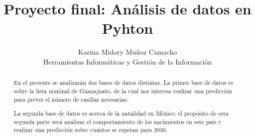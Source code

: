\documentclass[11pt]{article}
\title{\centering\fontsize{18}{16}\selectfont\textbf{Proyecto final: Análisis de datos en Pyhton}}
\author{Karina Midory Muñoz Camacho\\Herramientas Informáticas y Gestión de la Información}
\begin{document}
\maketitle

\begin{abstract}
	En el presente se analizarán dos bases de datos distintas. La primer base de datos es sobre la lista nominal de Guanajuato, de la cual nos interesa realizar una predicción para prever el número de casillas necesarias.\par La segunda base de datos es acerca de la natalidad en México; el propósito de esta segunda parte será analizar el comportamiento de los nacimientos en este país y realizar 	una predicción sobre cuántos se esperan para 2030.
\end{abstract}

\begin{multicols}{2}


\end{multicols}
\end{document}
